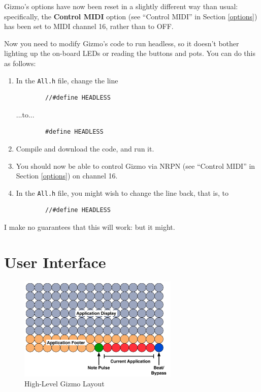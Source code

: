 \documentclass{article}
\begin{document}
Gizmo's options have now been reset in a slightly different way than usual: specifically, the {\bf Control MIDI} option (see ``Control MIDI'' in Section \ref{options}) has been set to MIDI channel 16, rather than to OFF.

Now you need to modify Gizmo's code to run headless, so it doesn't bother lighting up the on-board LEDs or reading the buttons and pots.   You can do this as follows:

\begin{enumerate}
\item In the \texttt{All.h} file, change the line 
\begin{verbatim}
        //#define HEADLESS
\end{verbatim}
...to...
\begin{verbatim}
        #define HEADLESS
\end{verbatim}
\item Compile and download the code, and run it.
\item You should now be able to control Gizmo via NRPN (see ``Control MIDI'' in Section \ref{options}) on channel 16.
\item In the \texttt{All.h} file, you might wish to change the line back, that is, to 
\begin{verbatim}
        //#define HEADLESS
\end{verbatim}

\end{enumerate}

I make no guarantees that this will work: but it might.

\clearpage

\section{User Interface}

\begin{figure}
\vspace{-1.5em}\includegraphics[width=3in]{OverallLayout.pdf}
\vspace{-2em}\caption{\small High-Level Gizmo Layout}
\label{HighLevelGizmoLayout}
\end{figure}
\end{document}
